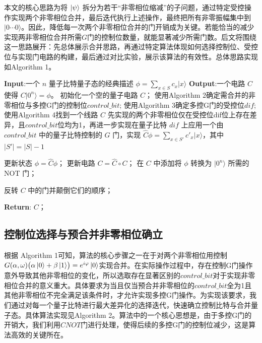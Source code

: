 \documentclass[10.5pt,compsoc,UTF8]{CjC}
\theoremstyle{mystyle}
\begin{document}
本文的核心思路为将 $\ket{\psi}$ 拆分为若干“非零相位缩减”的子问题，通过特定受控操作实现两个非零相位合并，最后迭代执行上述操作，最终把所有非零振幅集中到 $\lvert 0\cdots0\rangle$。因此，降低每一次两个非零相位合并的门开销成为关键。若能恰当的减少实现两非零相位合并所需$G$门的控制位数量，就能显著减少所需门数。后文将围绕这一思路展开：先总体展示合并思路，再通过特定算法体现如何选择控制位、受控位与实现门电路的构建，最后通过对比实验，展示该算法的有效性。总体思路实现如Algorithm 1。

\begin{algorithm}[H]
\caption{稀疏态制备}
\begin{algorithmic}[1]
\State \textbf{Input}:一个 $n$ 量子比特量子态的经典描述 $\phi = \sum_{x \in S} c_x |x\rangle$
\State \textbf{Output}:一个电路 $C$ 使得 $C |0^n\rangle = \phi$。
\State 初始化一个空的量子电路 $C$；
    \State 使用Algorithm 2确定需合并的非零相位与多控G门的控制位$control\_bit$;
    \State 使用Algorithm 3确定多控G门的受控位$dif$;
    \State 使用Algorithm 4找到一个线路 $\hat{C}$ 先实现的两个非零相位仅在受控位dif位上存在差异，且$control\_bit$位均为1，再进一步实现在量子比特 $dif$ 上应用一个由 $control\_bit$ 中的量子比特控制的 $G$ 门，实现 $\hat{C} \phi = \sum_{x \in S'} c'_x |x\rangle$，其中 $|S'| = |S|-1$
   
    \State 更新状态 $\phi = \hat{C}  \phi$；
    \State 更新电路 $C = \hat{C} \circ C$；
\EndWhile
\State 在 $C$ 中添加将 $\phi$ 转换为 $|0^n\rangle$ 所需的 NOT 门；

\State 反转 $C$ 中的门并颠倒它们的顺序；

\State \textbf{Return}: $C$；

\end{algorithmic}
\end{algorithm}


\subsection{控制位选择与预合并非零相位确立}
根据 Algorithm 1可知，算法的核心步骤之一在于对两个非零相位用控制$G(\alpha,\omega)\bigl(\alpha\ket{0}+\beta\ket{1}\bigr)=e^{i\varphi}\ket{0}$实现合并。在实际操作过程中，存在控制G门操作意外导致其他非零相位的变化，所以选取存在显著区别的$control\_bit$对于实现非零相位合并的意义重大。具体要求为当且仅当预合并非零相位的$control\_bit$全为1且其他非零相位不完全满足该条件时，才允许实现多控G门操作。为实现该要求，我们通过对每一个量子比特进行最大差异化的选择迭代，快速确立控制比特与合并量子态。具体算法实现见Algorithm 2。算法中的一个核心思想是，由于多控G门的开销大，我们利用$CNOT$门进行处理，使得后续的多控G门的控制位减少，这是算法高效的关键所在。
\end{document}
